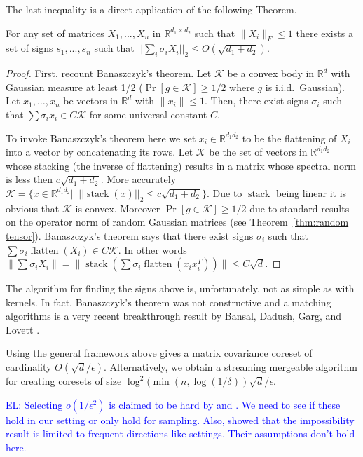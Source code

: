 \documentclass[anon,12pt]{colt2019} %
\newcommand{\el}[1]{\textcolor{blue}{EL: #1}}
\newcommand{\R}{\mathbb{R}}
\newcommand{\eps}{\epsilon}
\renewcommand{\Pr}{\operatorname{Pr}}
\begin{document}
\noindent The last inequality is a direct application of the following Theorem.
\begin{theorem}\label{BansalInDaHouz}
For any set of matrices $X_1,...,X_n$ in $\R^{d_1 \times d_2}$ such that $\|X_i\|_{F} \le 1$ there exists a set of signs $s_1,...,s_n$ such that $||\sum_i \sigma_i X_i||_{2} \le O(\sqrt{d_1 + d_2})$.
\end{theorem}
\begin{proof}
First, recount Banaszczyk's theorem. 
Let $\mathcal K$ be a convex body in $\R^d$ with Gaussian measure at least 1/2 ($\Pr[g \in \mathcal K] \ge 1/2$ where $g$ is i.i.d.\ Gaussian).
Let $x_1,\ldots,x_n$ be vectors in $\R^d$ with $\|x_i\| \le 1$. 
Then, there exist signs $\sigma_i$ such that $\sum \sigma_i x_i \in C \mathcal K$ for some universal constant $C$.

To invoke Banaszczyk's theorem here we set $x_i \in \R^{d_1d_2}$ to be the flattening of $X_i$ into a vector by concatenating its rows. 
Let $\mathcal K$ be the set of vectors in $\R^{d_1d_2}$ whose stacking (the inverse of flattening) results in a matrix whose spectral norm is less then $c\sqrt{d_1 + d_2}$.
More accurately $\mathcal K = \{x  \in \R^{d_1d_2} |\;\; ||\operatorname{stack}(x)||_2 \le c\sqrt{d_1+d_2}\}$. 
Due to $\operatorname{stack}$ being linear it is obvious that $\mathcal K$ is convex. 
Moreover $\Pr[g \in \mathcal K] \ge 1/2$ due to standard results on the operator norm of random Gaussian matrices (see Theorem~\ref{thm:random tensor}).
Banaszczyk's theorem says that there exist signs $\sigma_i$ such that $\sum \sigma_i \operatorname{flatten}(X_i) \in C \mathcal K$.
In other words $\| \sum \sigma_i X_i\| = \| \operatorname{stack}( \sum \sigma_i \operatorname{flatten}(x_i x_i^T)) \| \le C \sqrt{d}$. 
\end{proof}
The algorithm for finding the signs above is, unfortunately, not as simple as with kernels. 
In fact, Banaszczyk's theorem was not constructive and a matching algorithms is a very recent breakthrough result by Bansal, Dadush, Garg, and Lovett \cite{DBLP:conf/stoc/BansalDGL18}.

Using the general framework above gives a matrix covariance coreset of cardinality $O(\sqrt{d}/\eps)$.
Alternatively, we obtain a streaming mergeable algorithm for creating coresets of size $\log^{2}(\min(n, \log(1/\delta)) \sqrt{d}/\eps$.



\el{Selecting $o(1/\eps^2)$ is claimed to be hard by \cite{DBLP:conf/focs/DeshpandeR10} and \cite{DBLP:conf/soda/DeshpandeRVW06}. We need to see if these hold in our setting or only hold for sampling.  Also, \cite{DBLP:conf/soda/GhashamiP14} showed that the impossibility result is limited to frequent directions like settings. Their assumptions don't hold here.} 
\end{document}
